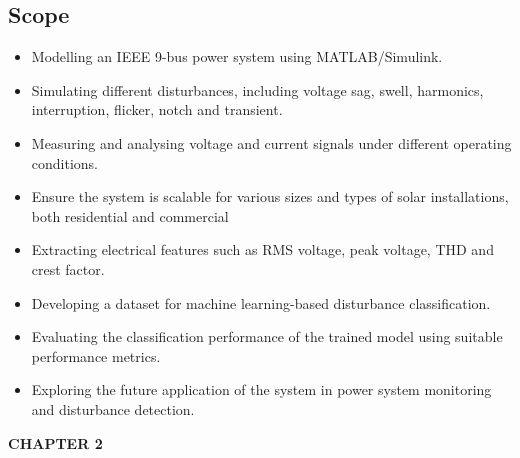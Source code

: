 \documentclass[12pt]{article}
\begin{document}
\begin{center}
\subsection{Scope}
\raggedright
\justifying
\begin{itemize}
    \item  Modelling an IEEE 9-bus power system using MATLAB/Simulink.
\end{itemize}\begin{itemize}
    \item  Simulating different disturbances, including voltage sag, swell, harmonics, interruption, flicker, notch and transient.
\end{itemize}\begin{itemize}
    \item Measuring and analysing voltage and current signals under different operating conditions.
\end{itemize}\begin{itemize}
    \item  Ensure the system is scalable for various sizes and types of solar installations, both residential and commercial
\end{itemize}\begin{itemize}
    \item Extracting electrical features such as RMS voltage, peak voltage, THD and crest factor.
\end{itemize}\begin{itemize}
    \item  Developing a dataset for machine learning-based disturbance classification.
\end{itemize}\begin{itemize}
    \item Evaluating the classification performance of the trained model using suitable performance metrics.
\end{itemize}\begin{itemize}
    \item  Exploring the future application of the system in power system monitoring and disturbance detection.
\end{itemize}

\clearpage


\begin{center}
    \vspace{2cm}
    \textbf{\LARGE CHAPTER 2}\\[2cm]
\end{center}


\end{center}
\end{document}
